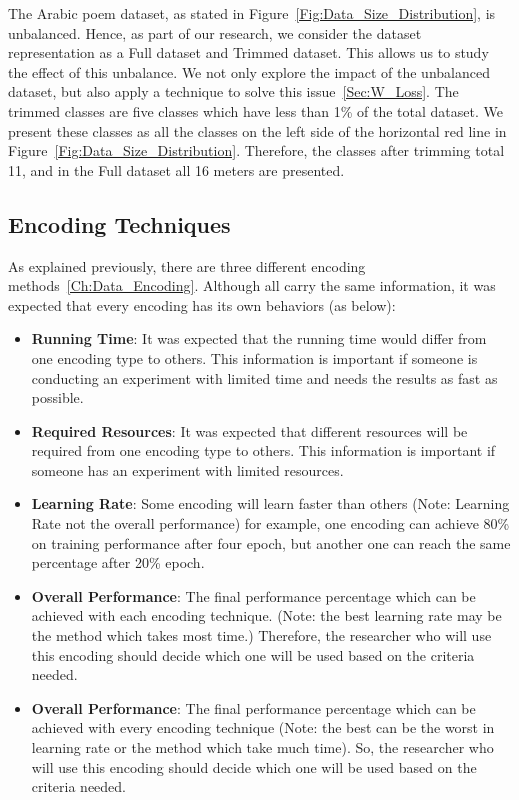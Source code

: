 The Arabic poem dataset, as stated in Figure~\ref{Fig:Data_Size_Distribution}, is unbalanced. Hence, as part of our research, we consider the dataset representation as a Full dataset and Trimmed dataset. This allows us to study the effect of this unbalance. We not only explore the impact of the unbalanced dataset, but also apply a technique to solve this issue~\ref{Sec:W_Loss}. The trimmed classes are five classes which have less than 1\% of the total dataset. We present these classes as all the classes on the left side of the horizontal red line in Figure~\ref{Fig:Data_Size_Distribution}. Therefore, the classes after trimming total 11, and in the Full dataset all 16 meters are presented.

\subsection{Encoding Techniques}

As explained previously, there are three different encoding methods~\ref{Ch:Data_Encoding}. Although all carry the same information, it was expected that every encoding has its own behaviors (as below):

\begin{itemize}
 \item \textbf{Running Time}: It was expected that the running time would differ from one encoding type to others. This information is important if someone is conducting an experiment with limited time and needs the results as fast as possible.
 \item \textbf{Required Resources}: It was expected that different resources will be required from one encoding type to others. This information is important if someone has an experiment with limited resources.
 
 \item \textbf{Learning Rate}: Some encoding will learn faster than others (Note: Learning Rate not the overall performance) for example, one encoding can achieve 80\% on training performance after four epoch, but another one can reach the same percentage after 20\% epoch.
 \item \textbf{Overall Performance}: The final performance percentage which can be achieved with each encoding technique. (Note: the best learning rate may be the method which takes most time.) Therefore, the researcher who will use this encoding should decide which one will be used based on the criteria needed.

 \item \textbf{Overall Performance}: The final performance percentage which can be achieved with every encoding technique (Note: the best can be the worst in learning rate or the method which take much time). So, the researcher who will use this encoding should decide which one will be used based on the criteria needed.

\end{itemize}

